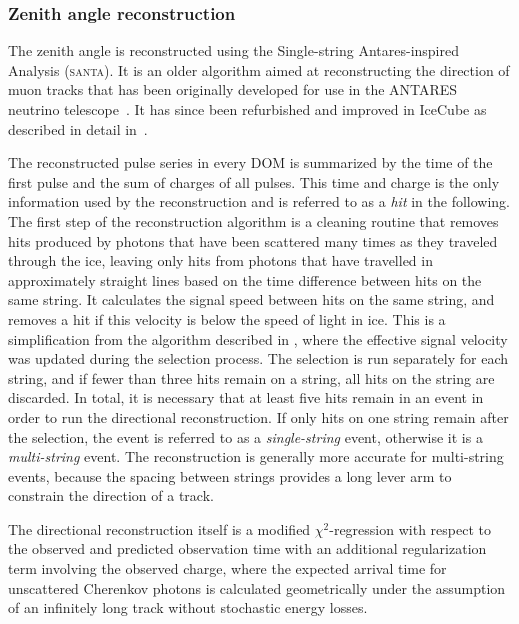 \subsubsection{Zenith angle reconstruction}
The zenith angle is reconstructed using the Single-string Antares-inspired Analysis (\textsc{santa}). It is an older algorithm aimed at reconstructing the direction of muon tracks that has been originally developed for use in the ANTARES neutrino telescope~. It has since been refurbished and improved in IceCube as described in detail in~.

The reconstructed pulse series in every DOM is summarized by the time of the first pulse and the sum of charges of all pulses. This time and charge is the only information used by the reconstruction and is referred to as a \emph{hit} in the following. The first step of the  reconstruction algorithm is a cleaning routine that removes hits produced
by photons that have been scattered many times as they traveled
through the ice, leaving only hits from photons that have travelled in approximately straight lines based on the time difference between hits on the same string.
It calculates the signal speed between hits on the same string, and removes a hit if this velocity is below the speed of light in ice. This is a simplification from the algorithm described in \cite{Garza2014Measurement}, where the effective signal velocity was updated during the selection process. The selection is run separately for each string, and if fewer than three hits remain on a string, all hits on the string are discarded. In total, it is necessary that at least five hits remain in an event in order to run the directional reconstruction. If only hits on one string remain after the selection, the event is referred to as a \emph{single-string} event, otherwise it is a \emph{multi-string} event. The reconstruction is generally more accurate for multi-string events, because the spacing between strings provides a long lever arm to constrain the direction of a track.

The directional reconstruction itself is a modified $\chi^2$-regression with respect to the observed and predicted observation time with an additional regularization term involving the observed charge, where the expected arrival time for unscattered Cherenkov photons is calculated geometrically under the assumption of an infinitely long track without stochastic energy losses.

